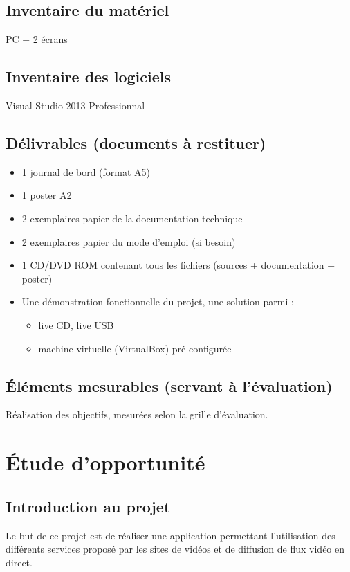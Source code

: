 \documentclass[11pt]{report} %
\begin{document}
	\section{Inventaire du matériel}
	PC + 2 écrans

	\section{Inventaire des logiciels}
	Visual Studio 2013 Professionnal
	
	\section{Délivrables (documents à restituer)}
	\begin{itemize}
		\item 1 journal de bord (format A5)
		\item 1 poster A2
		\item 2 exemplaires papier de la documentation technique
		\item 2 exemplaires papier du mode d'emploi (si besoin)
		\item 1 CD/DVD ROM contenant tous les fichiers (sources + documentation + poster)
		\item Une démonstration fonctionnelle du projet, une solution parmi :
		\begin{itemize}
			\item live CD, live USB
			\item machine virtuelle (VirtualBox) pré-configurée
		\end{itemize}
	\end{itemize}

	\section{Éléments mesurables (servant à l'évaluation)}
	Réalisation des objectifs, mesurées selon la grille d'évaluation.

\chapter{Étude d'opportunité}
\newpage

	\section{Introduction au projet}
	Le but de ce projet est de réaliser une application permettant l'utilisation des différents services proposé par les sites de vidéos et de diffusion de flux vidéo en direct.
\end{document}
